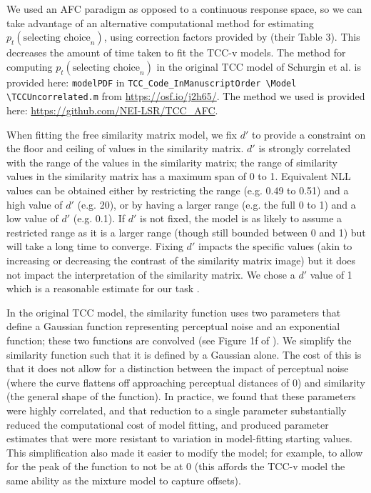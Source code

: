 We used an AFC paradigm as opposed to a continuous response space, so we can take advantage of an alternative computational method for estimating $p_t(\text{selecting choice}_n)$, using correction factors provided by \citet{mcgraw_common_1992} (their Table 3). 
This decreases the amount of time taken to fit the TCC-v models. 
The method for computing $p_t(\text{selecting choice}_n)$ in the original TCC model of Schurgin et al. is provided here: \verb|modelPDF| in \verb|TCC_Code_InManuscriptOrder |\verb|\Model| \verb|\TCCUncorrelated.m| from \url{https://osf.io/j2h65/}. 
The method we used is provided here: \url{https://github.com/NEI-LSR/TCC_AFC}.

When fitting the free similarity matrix model, we fix $d'$ to provide a constraint on the floor and ceiling of values in the similarity matrix.
$d'$ is strongly correlated with the range of the values in the similarity matrix; the range of similarity values in the similarity matrix has a maximum span of 0 to 1. 
Equivalent NLL values can be obtained either by restricting the range (e.g. 0.49 to 0.51) and a high value of $d'$ (e.g. 20), or by having a larger range (e.g. the full 0 to 1) and a low value of $d'$ (e.g. 0.1). 
If $d'$ is not fixed, the model is as likely to assume a restricted range as it is a larger range (though still bounded between 0 and 1) but will take a long time to converge. 
Fixing $d'$ impacts the specific values (akin to increasing or decreasing the contrast of the similarity matrix image) but it does not impact the interpretation of the similarity matrix. 
We chose a $d'$ value of 1 which is a reasonable estimate for our task \citep{schurgin_psychophysical_2020}.

In the original TCC model, the similarity function uses two parameters that define a Gaussian function representing perceptual noise and an exponential function; these two functions are convolved (see Figure 1f of \citep{schurgin_psychophysical_2020}). 
We simplify the similarity function such that it is defined by a Gaussian alone. 
The cost of this is that it does not allow for a distinction between the impact of perceptual noise (where the curve flattens off approaching perceptual distances of 0) and similarity (the general shape of the function). 
In practice, we found that these parameters were highly correlated, and that reduction to a single parameter substantially reduced the computational cost of model fitting, and produced parameter estimates that were more resistant to variation in model-fitting starting values. 
This simplification also made it easier to modify the model; for example, to allow for the peak of the function to not be at 0 (this affords the TCC-v model the same ability as the mixture model to capture offsets). 

